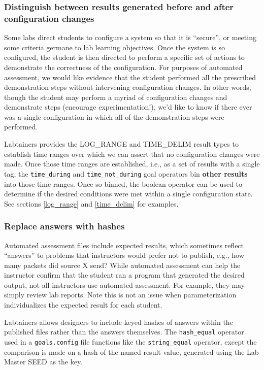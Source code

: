 \documentclass[12pt]{article}
\begin{document}
\subsubsection{Distinguish between results generated before and after configuration changes}
\label{config-ranges}
Some labs direct students to configure a system so that it is ``secure'', or meeting some criteria
germane to lab learning objectives.  Once the system is so configured, the student is then
directed to perform a specific set of actions to demonstrate the correctness of the
configuration.  For purposes of automated assessment, we would like evidence that
the student performed all the prescribed demonstration steps without intervening
configuration changes.  In other words, though the student may perform a myriad of
configuration changes and demonstrate steps (encourage experimentation!), 
we'd like to know if there ever was a
single configuration in which all of the demonstration steps were performed.

Labtainers provides the {LOG\_RANGE} and {TIME\_DELIM} result types to establish time
ranges over which we can assert that no configuration changes were made.  Once those time ranges
are established, i.e., as a set of results with a single tag, the {\tt time\_during} and
{\tt time\_not\_during} goal operators bin \textbf{other results} into
those time ranges.  Once so binned, the boolean operator can be used to determine if
the desired conditions were met within a single configuration state.  See sections
\ref{log_range} and \ref{time_delim} for examples.

\subsubsection{Replace answers with hashes}
\label{hash-goals}
Automated assessment files include expected results, which sometimes reflect ``answers'' to problems
that instructors would prefer not to publish, e.g., how many packets did source X send?
While automated assessment can help the instructor confirm that the student ran a program that generated the
desired output, not all instructors use automated assessment.  For example, they may simply review lab reports.
Note this is not an issue when parameterization individualizes the expected result for each student.

Labtainers allows designers to include keyed hashes of answers within the published files rather
than the answers themselves.  The {\tt hash\_equal} operator used in a {\tt goals.config} file functions like
the {\tt string\_equal} operator, except the comparison is made on a hash of the named result value, generated
using the Lab Master SEED as the key.  
\end{document}

